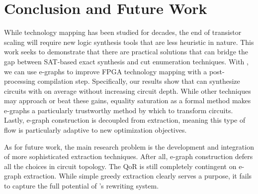 \section{Conclusion and Future Work}\label{sec:conclusion}
While technology mapping has been studied for decades, the end of transistor
scaling will require new logic synthesis tools that are less heuristic in
nature. This work seeks to demonstrate that there are practical solutions that
can bridge the gap between SAT-based exact synthesis and cut enumeration
techniques. With \shortname{}, we can use e-graphs to improve FPGA technology
mapping with a post-processing compilation step. Specifically, our results show
that \shortname{} can synthesize circuits with \metric{} on average without
increasing circuit depth. While other techniques may approach or beat these
gains, equality saturation as a formal method makes e-graphs a particularly
trustworthy method by which to transform circuits. Lastly, e-graph construction
is decoupled from extraction, meaning this type of flow is particularly
adaptive to new optimization objectives.

As for future work, the main research problem is the development and
integration of more sophisticated extraction techniques. After all, e-graph
construction defers all the choices in circuit topology. The QoR is still
completely contingent on e-graph extraction. While simple greedy extraction
clearly serves a purpose, it fails to capture the full potential of
\shortname{}'s rewriting system. 